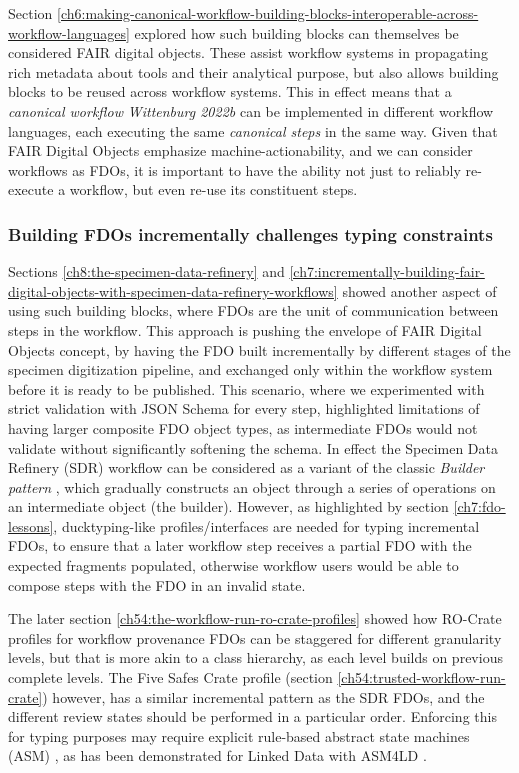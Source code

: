 Section \vref{ch6:making-canonical-workflow-building-blocks-interoperable-across-workflow-languages} explored how such building blocks can themselves be considered FAIR digital objects. These assist workflow systems in propagating rich metadata about tools and their analytical purpose, but also allows building blocks to be reused across workflow systems. This in effect means that a \emph{canonical workflow} \emph{Wittenburg 2022b} can be implemented in different workflow languages, each executing the same \emph{canonical steps} in the same way. Given that FAIR Digital Objects emphasize machine-actionability, and we can consider workflows as FDOs, it is important to have the ability not just to reliably re-execute a workflow, but even re-use its constituent steps. 


\subsubsection{Building FDOs incrementally challenges typing constraints}
\label{ch61:buildingfdo}

Sections \vref{ch8:the-specimen-data-refinery} and \vref{ch7:incrementally-building-fair-digital-objects-with-specimen-data-refinery-workflows} showed another aspect of using such building blocks, where FDOs are the unit of communication between steps in the workflow. 
This approach is pushing the envelope of FAIR Digital Objects concept, by having the FDO built incrementally by different stages of the specimen digitization pipeline, and exchanged only within the workflow system before it is ready to be published. 
This scenario, where we experimented with strict validation with JSON Schema for every step, highlighted limitations of having larger composite FDO object types, as intermediate FDOs would not validate without significantly softening the schema.
In effect the Specimen Data Refinery (SDR) workflow can be considered as a variant of the classic \emph{Builder pattern} \cite[pp. 97--106]{Gamma 1995}, which gradually constructs an object through a series of operations on an intermediate object (the builder).
However, as highlighted by section \vref{ch7:fdo-lessons}, ducktyping-like profiles/interfaces are needed for typing incremental FDOs, to ensure that a later workflow step receives a partial FDO with the expected fragments populated, otherwise workflow users would be able to compose steps with the FDO in an invalid state. 

The later section \vref{ch54:the-workflow-run-ro-crate-profiles} showed how RO-Crate profiles for workflow provenance FDOs can be staggered for different granularity levels, but that is more akin to a class hierarchy, as each level builds on previous complete levels.  The Five Safes Crate profile (section \vref{ch54:trusted-workflow-run-crate}) however, has a similar incremental pattern as the SDR FDOs, and the different review states should be performed in a particular order. Enforcing this for typing purposes may require explicit rule-based abstract state machines (ASM) \cite{Gurevich 1995}, as has been demonstrated for Linked Data with ASM4LD \cite{Käfer 2018a,Käfer 2018b}.


